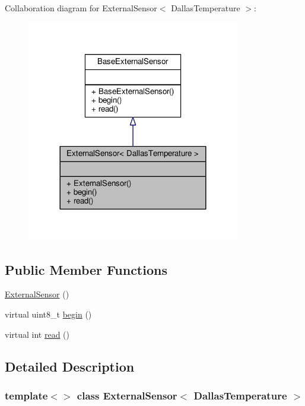 Collaboration diagram for External\+Sensor$<$ Dallas\+Temperature $>$\+:
\nopagebreak
\begin{figure}[H]
\begin{center}
\leavevmode
\includegraphics[width=264pt]{d0/d86/class_external_sensor_3_01_dallas_temperature_01_4__coll__graph}
\end{center}
\end{figure}
\subsection*{Public Member Functions}
\begin{DoxyCompactItemize}
\item 
\hyperlink{class_external_sensor_3_01_dallas_temperature_01_4_ad290681e8780cdf1870416eee99d699d}{External\+Sensor} ()
\item 
virtual uint8\+\_\+t \hyperlink{class_external_sensor_3_01_dallas_temperature_01_4_ac5275129b05e2ff8df45d5b222a661d9}{begin} ()
\item 
virtual int \hyperlink{class_external_sensor_3_01_dallas_temperature_01_4_a127ead06440ec972c22db2abeb8e2b51}{read} ()
\end{DoxyCompactItemize}


\subsection{Detailed Description}
\subsubsection*{template$<$$>$\newline
class External\+Sensor$<$ Dallas\+Temperature $>$}

